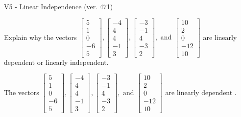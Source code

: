 \begin{exercise}
  \begin{exerciseTitle}V5 - Linear Independence (ver. 471)\end{exerciseTitle}
  \begin{exerciseStatement}
    Explain why the vectors \(\left[\begin{array}{r}
5 \\
1 \\
0 \\
-6 \\
5
\end{array}\right] , \left[\begin{array}{r}
-4 \\
4 \\
4 \\
-1 \\
3
\end{array}\right] , \left[\begin{array}{r}
-3 \\
-1 \\
4 \\
-3 \\
2
\end{array}\right] , \text{ and } \left[\begin{array}{r}
10 \\
2 \\
0 \\
-12 \\
10
\end{array}\right]\) are linearly dependent or linearly independent.	


  \end{exerciseStatement}
  \begin{exerciseAnswer}
   The vectors \(\left[\begin{array}{r}
5 \\
1 \\
0 \\
-6 \\
5
\end{array}\right] , \left[\begin{array}{r}
-4 \\
4 \\
4 \\
-1 \\
3
\end{array}\right] , \left[\begin{array}{r}
-3 \\
-1 \\
4 \\
-3 \\
2
\end{array}\right] , \text{ and } \left[\begin{array}{r}
10 \\
2 \\
0 \\
-12 \\
10
\end{array}\right]\) are 
  	 linearly dependent  .
  


  \end{exerciseAnswer}
\end{exercise}